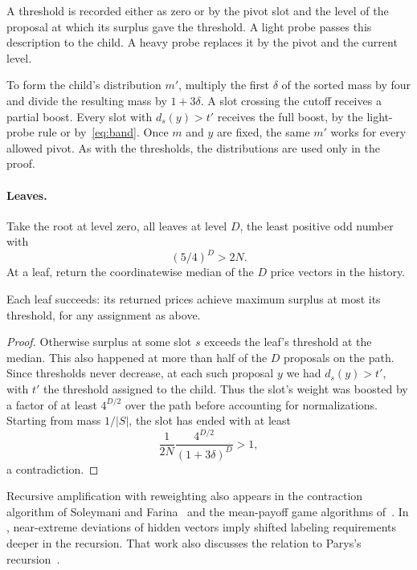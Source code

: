 A threshold is recorded either as zero or by the pivot slot and the
level of the proposal at which its surplus gave the threshold.
A light probe passes this description to the child. A heavy probe
replaces it by the pivot and the current level.

To form the child's distribution \(m'\), multiply the first
\(\delta\) of the sorted mass by four and divide the resulting mass
by \(1+3\delta\). A slot crossing the cutoff receives a partial
boost. Every slot with \(d_s(y)>t'\) receives the full boost, by
the light-probe rule or by~\eqref{eq:band}. Once \(m\) and \(y\)
are fixed, the same \(m'\) works for every allowed pivot. As with
the thresholds, the distributions are used only in the proof.



\paragraph{Leaves.}
Take the root at level zero, all leaves at level \(D\),
the least positive odd number with
\[
               (5/4)^D>2N .
\]
At a leaf, return the coordinatewise median of the \(D\)
price vectors in the history.

\begin{lemma}\label{lem:leaf}
Each leaf succeeds: its returned prices achieve maximum surplus
at most its threshold, for any assignment as above.
\end{lemma}
\begin{proof}
Otherwise surplus at some slot \(s\) exceeds the leaf's threshold
at the median. This also happened at more than half of the
\(D\) proposals on the path.
Since thresholds never decrease, at each such proposal \(y\)
we had \(d_s(y)>t'\), with \(t'\)
the threshold assigned to the child. Thus the slot's weight was boosted by
a factor of at least \(4^{D/2}\) over the path before accounting for
normalizations. Starting from mass \(1/|S|\),
the slot has ended with at least
\[
       \frac1{2N}\frac{4^{D/2}}{(1+3\delta)^D}>1 ,
\]
a contradiction.
\end{proof}

Recursive amplification with reweighting also appears in the
contraction algorithm of Soleymani and Farina~\cite[\S6]{SF} and the
mean-payoff game algorithms of~\cite{OAIDe,OAIRa,OAITu}. In
\cite[\S\S3--5]{OAIDe}, near-extreme deviations of hidden vectors imply
shifted labeling requirements deeper in the recursion. That work
also discusses the relation to Parys's recursion~\cite{Parys}.

